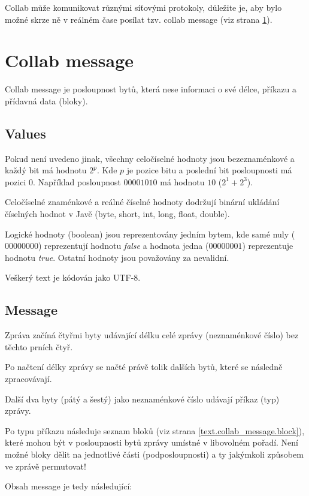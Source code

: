 \documentclass[12pt,oneside,a4paper]{report}
\begin{document}
Collab může komunikovat různými síťovými protokoly, důležite je, aby bylo možné skrze ně v reálném čase posílat tzv. collab message (viz strana \ref{text.collab_message}).

\chapter{Collab message}
\label{text.collab_message}

Collab message je posloupnost bytů, která nese informaci o své délce, příkazu a přídavná data (bloky).

\section{Values}

Pokud není uvedeno jinak, všechny celočíselné hodnoty jsou bezeznaménkové a každý bit má hodnotu $2^{p}$. Kde $p$ je pozice bitu a poslední bit posloupnosti má pozici $0$. Například posloupnost $00001010$ má hodnotu $10$ ($2^1 + 2^3$).

Celočíselné znaménkové a reálné číselné hodnoty dodržují binární ukládání číselných hodnot v Javě (byte, short, int, long, float, double).

Logické hodnoty (boolean) jsou reprezentovány jedním bytem, kde samé nuly ($00000000$) reprezentují hodnotu \emph{false} a hodnota jedna ($00000001$) reprezentuje hodnotu \emph{true}. Ostatní hodnoty jsou považovány za nevalidní.

Veškerý text je kódován jako UTF-8.

\section{Message}

Zpráva začíná čtyřmi byty udávající délku celé zprávy (neznaménkové číslo) bez těchto prních čtyř.

Po načtení délky zprávy se načté právě tolik dalších bytů, které se následně zpracovávají.

Další dva byty (pátý a šestý) jako neznaménkové číslo udávají příkaz (typ) zprávy.

Po typu příkazu následuje seznam bloků (viz strana \ref{text.collab_message.block}), které mohou být v posloupnosti bytů zprávy umístné v libovolném pořadí. Není možné bloky dělit na jednotlivé části (podposloupnosti) a ty jakýmkoli způsobem ve zprávě permutovat!

Obsah message je tedy následující:
\end{document}
